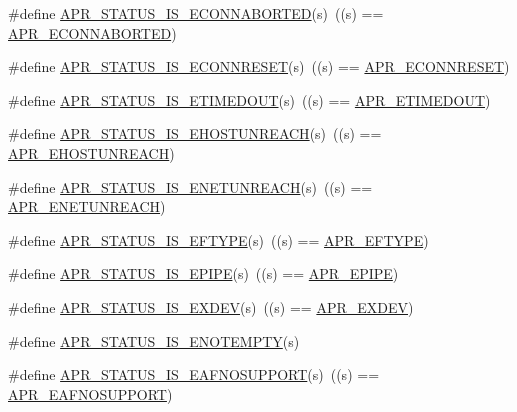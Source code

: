 \begin{DoxyCompactItemize}
\item 
\#define \hyperlink{group___a_p_r___s_t_a_t_u_s___i_s_ga528a8032b13c75fbdeb9bf7e4c0be493}{A\-P\-R\-\_\-\-S\-T\-A\-T\-U\-S\-\_\-\-I\-S\-\_\-\-E\-C\-O\-N\-N\-A\-B\-O\-R\-T\-E\-D}(s)~((s) == \hyperlink{group___a_p_r___error_ga9458da18e0ee46a5d37c9cdfdc43efd2}{A\-P\-R\-\_\-\-E\-C\-O\-N\-N\-A\-B\-O\-R\-T\-E\-D})
\item 
\#define \hyperlink{group___a_p_r___s_t_a_t_u_s___i_s_ga85e2cb1b4c904a9edfbc0d94203f76b6}{A\-P\-R\-\_\-\-S\-T\-A\-T\-U\-S\-\_\-\-I\-S\-\_\-\-E\-C\-O\-N\-N\-R\-E\-S\-E\-T}(s)~((s) == \hyperlink{group___a_p_r___error_ga264bfe2056e917728e9ed060b58869c2}{A\-P\-R\-\_\-\-E\-C\-O\-N\-N\-R\-E\-S\-E\-T})
\item 
\#define \hyperlink{group___a_p_r___s_t_a_t_u_s___i_s_ga6adc2f539eabedb504294458be4f6251}{A\-P\-R\-\_\-\-S\-T\-A\-T\-U\-S\-\_\-\-I\-S\-\_\-\-E\-T\-I\-M\-E\-D\-O\-U\-T}(s)~((s) == \hyperlink{group___a_p_r___error_ga6aeccbe9accb34f0adc1cb1ab9a82a8d}{A\-P\-R\-\_\-\-E\-T\-I\-M\-E\-D\-O\-U\-T})
\item 
\#define \hyperlink{group___a_p_r___s_t_a_t_u_s___i_s_gad9307ff02e50296c528b79a670dc80bb}{A\-P\-R\-\_\-\-S\-T\-A\-T\-U\-S\-\_\-\-I\-S\-\_\-\-E\-H\-O\-S\-T\-U\-N\-R\-E\-A\-C\-H}(s)~((s) == \hyperlink{group___a_p_r___error_ga489b0c02fa7cf33ed6d698d385661f86}{A\-P\-R\-\_\-\-E\-H\-O\-S\-T\-U\-N\-R\-E\-A\-C\-H})
\item 
\#define \hyperlink{group___a_p_r___s_t_a_t_u_s___i_s_ga19911958b3dd62559fb6c245ec579c27}{A\-P\-R\-\_\-\-S\-T\-A\-T\-U\-S\-\_\-\-I\-S\-\_\-\-E\-N\-E\-T\-U\-N\-R\-E\-A\-C\-H}(s)~((s) == \hyperlink{group___a_p_r___error_gab9b7124a88817d1b69cdef059f7dc689}{A\-P\-R\-\_\-\-E\-N\-E\-T\-U\-N\-R\-E\-A\-C\-H})
\item 
\#define \hyperlink{group___a_p_r___s_t_a_t_u_s___i_s_gaf37f4f8f6c929728bf55b927576bdb69}{A\-P\-R\-\_\-\-S\-T\-A\-T\-U\-S\-\_\-\-I\-S\-\_\-\-E\-F\-T\-Y\-P\-E}(s)~((s) == \hyperlink{group___a_p_r___error_gac358701354d03c37e3f0de12ed6d9afc}{A\-P\-R\-\_\-\-E\-F\-T\-Y\-P\-E})
\item 
\#define \hyperlink{group___a_p_r___s_t_a_t_u_s___i_s_gad1c0cf4e5619025a87c8edfc668d49f6}{A\-P\-R\-\_\-\-S\-T\-A\-T\-U\-S\-\_\-\-I\-S\-\_\-\-E\-P\-I\-P\-E}(s)~((s) == \hyperlink{group___a_p_r___error_gae985330e30e374714ff1742485597f5d}{A\-P\-R\-\_\-\-E\-P\-I\-P\-E})
\item 
\#define \hyperlink{group___a_p_r___s_t_a_t_u_s___i_s_ga1a11d6ff007e40f93f9db1b3c6e76617}{A\-P\-R\-\_\-\-S\-T\-A\-T\-U\-S\-\_\-\-I\-S\-\_\-\-E\-X\-D\-E\-V}(s)~((s) == \hyperlink{group___a_p_r___error_ga0562023bd8ebe580b9bbb9f7b04d3f5d}{A\-P\-R\-\_\-\-E\-X\-D\-E\-V})
\item 
\#define \hyperlink{group___a_p_r___s_t_a_t_u_s___i_s_ga6cced4e794d3e7ed6dae3e53c337cc02}{A\-P\-R\-\_\-\-S\-T\-A\-T\-U\-S\-\_\-\-I\-S\-\_\-\-E\-N\-O\-T\-E\-M\-P\-T\-Y}(s)
\item 
\#define \hyperlink{group___a_p_r___s_t_a_t_u_s___i_s_ga9309aade5bd335ac5233170e8c120cb9}{A\-P\-R\-\_\-\-S\-T\-A\-T\-U\-S\-\_\-\-I\-S\-\_\-\-E\-A\-F\-N\-O\-S\-U\-P\-P\-O\-R\-T}(s)~((s) == \hyperlink{group___a_p_r___error_ga76b558840838bcb94a4811a8e52df7a6}{A\-P\-R\-\_\-\-E\-A\-F\-N\-O\-S\-U\-P\-P\-O\-R\-T})
\end{DoxyCompactItemize}


